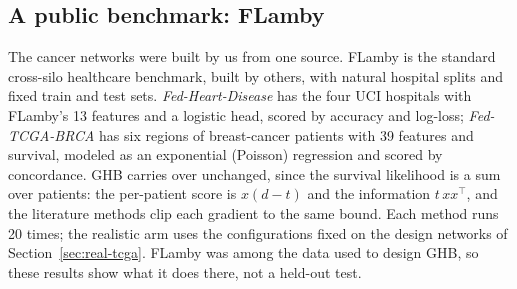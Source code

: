 \subsection{A public benchmark: FLamby}\label{sec:real-flamby}

The cancer networks were built by us from one source. FLamby \cite{ogierduterrail2022flamby} is the standard cross-silo healthcare benchmark, built by others, with natural hospital splits and fixed train and test sets. \emph{Fed-Heart-Disease} has the four UCI hospitals with FLamby's 13 features and a logistic head, scored by accuracy and log-loss; \emph{Fed-TCGA-BRCA} has six regions of breast-cancer patients with 39 features and survival, modeled as an exponential (Poisson) regression and scored by concordance. GHB carries over unchanged, since the survival likelihood is a sum over patients: the per-patient score is $x(d-t)$ and the information $t\,xx^\top$, and the literature methods clip each gradient to the same bound. Each method runs 20 times; the realistic arm uses the configurations fixed on the design networks of Section~\ref{sec:real-tcga}. FLamby was among the data used to design GHB, so these results show what it does there, not a held-out test.

